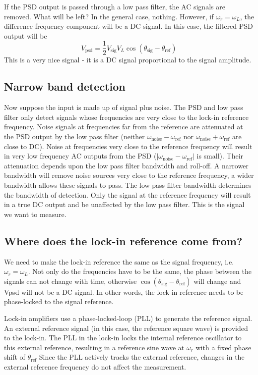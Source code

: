 \documentclass{../lab}
\begin{document}
If the PSD output is passed through a low pass filter, the AC signals are removed. What will be left? In the general case, nothing. However, if $\omega_r = \omega_L$, the difference frequency component will be a DC signal. In this case, the filtered PSD output will be
\[
    V_\text{psd} = \frac{1}{2} V_\text{sig} V_L \cos(\theta_\text{sig} - \theta_\text{ref})
\]
This is a very nice signal - it is a DC signal proportional to the signal amplitude.

\subsection{Narrow band detection}

Now suppose the input is made up of signal plus noise. The PSD and low pass filter only detect signals whose frequencies are very close to the lock-in reference frequency. Noise signals at frequencies far from the reference are attenuated at the PSD output by the low pass filter (neither $\omega_\text{noise} - \omega_\text{ref}$ nor $\omega_\text{noise} + \omega_\text{ref}$ are close to DC). Noise at frequencies very close to the reference frequency will result in very low frequency AC outputs from the PSD ($|\omega_\text{noise} - \omega_\text{ref}|$ is small). Their attenuation depends upon the low pass filter bandwidth and roll-off. A narrower bandwidth will remove noise sources very close to the reference frequency, a wider bandwidth allows these signals to pass. The low pass filter bandwidth determines the bandwidth of detection. Only the signal at the reference frequency will result in a true DC output and be unaffected by the low pass filter. This is the signal we want to measure.

\newpage

\subsection{Where does the lock-in reference come from?}

We need to make the lock-in reference the same as the signal frequency, i.e. $\omega_r = \omega_L$. Not only do the frequencies have to be the same, the phase between the signals can not change with time, otherwise $\cos(\theta_\text{sig} - \theta_\text{ref})$ will change and Vpsd will not be a DC signal. In other words, the lock-in reference needs to be phase-locked to the signal reference.

Lock-in amplifiers use a phase-locked-loop (PLL) to generate the reference signal. An external reference signal (in this case, the reference square wave) is provided to the lock-in. The PLL in the lock-in locks the internal reference oscillator to this external reference, resulting in a reference sine wave at $\omega_r $ with a fixed phase shift of $\theta_\text{ref}$ Since the PLL actively tracks the external reference, changes in the external reference frequency do not affect the measurement.
\end{document}
